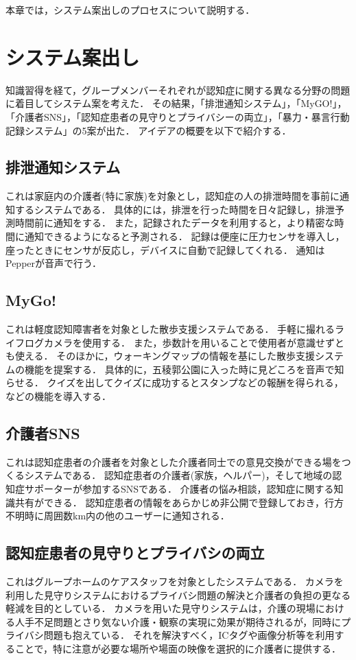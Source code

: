 \documentclass[../report]{subfiles}
\begin{document}
本章では，システム案出しのプロセスについて説明する．

\section{システム案出し}\label{sec:andashi}
知識習得を経て，グループメンバーそれぞれが認知症に関する異なる分野の問題に着目してシステム案を考えた．
その結果，「排泄通知システム」，「MyGO!」，「介護者SNS」，「認知症患者の見守りとプライバシーの両立」，「暴力・暴言行動記録システム」の5案が出た．
アイデアの概要を以下で紹介する．

\subsection{排泄通知システム}
これは家庭内の介護者(特に家族)を対象とし，認知症の人の排泄時間を事前に通知するシステムである．
具体的には，排泄を行った時間を日々記録し，排泄予測時間前に通知をする．
また，記録されたデータを利用すると，より精密な時間に通知できるようになると予測される．
記録は便座に圧力センサを導入し，座ったときにセンサが反応し，デバイスに自動で記録してくれる．
通知はPepperが音声で行う．

\subsection{MyGo!}
これは軽度認知障害者を対象とした散歩支援システムである．
手軽に撮れるライフログカメラを使用する．
また，歩数計を用いることで使用者が意識せずとも使える．
そのほかに，ウォーキングマップの情報を基にした散歩支援システムの機能を提案する．
具体的に，五稜郭公園に入った時に見どころを音声で知らせる．
クイズを出してクイズに成功するとスタンプなどの報酬を得られる，などの機能を導入する．

\subsection{介護者SNS}
これは認知症患者の介護者を対象とした介護者同士での意見交換ができる場をつくるシステムである．
認知症患者の介護者(家族，ヘルパー)，そして地域の認知症サポーターが参加するSNSである．
介護者の悩み相談，認知症に関する知識共有ができる．
認知症患者の情報をあらかじめ非公開で登録しておき，行方不明時に周囲数km内の他のユーザーに通知される．

\subsection{認知症患者の見守りとプライバシの両立}
これはグループホームのケアスタッフを対象としたシステムである．
カメラを利用した見守りシステムにおけるプライバシ問題の解決と介護者の負担の更なる軽減を目的としている．
カメラを用いた見守りシステムは，介護の現場における人手不足問題とさり気ない介護・観察の実現に効果が期待されるが，同時にプライバシ問題も抱えている．
それを解決すべく，ICタグや画像分析等を利用することで，特に注意が必要な場所や場面の映像を選択的に介護者に提供する．
\end{document}
